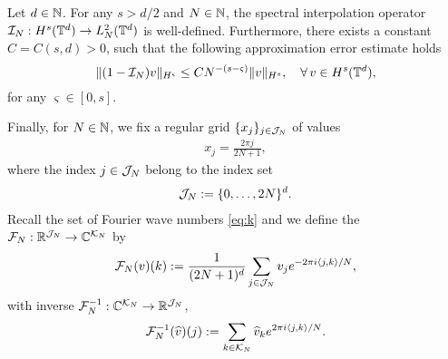 \documentclass[reqno,a4paper]{amsart}
\begin{document}
\begin{theorem}
\label{thm:psest}
Let $d \in \mathbb{N}$. For any $s > d/2$ and $N\in \mathbb{N}$, the spectral interpolation operator $\mathcal{I}_N: H^s(\mathbb{T}^d) \to L^2_N(\mathbb{T}^d)$ is well-defined. Furthermore, there exists a constant $C=C(s,d)>0$, such that the following approximation error estimate holds
\[
\Vert (1-\mathcal{I}_N) v \Vert_{H^\varsigma}
\le 
C N^{-(s-\varsigma)} \Vert v \Vert_{H^s},
\quad
\forall \, v\in H^s(\mathbb{T}^d),
\]
 for any $\varsigma \in [0,s]$.	
\end{theorem}

Finally, for $N\in \mathbb{N}$, we fix a regular grid $\{x_j\}_{j\in \mathcal{J}_N}$ of values
\begin{align} \label{eq:grid}
x_j = \frac{2\pi j}{2N+1}, 
\end{align}
where the index $j\in \mathcal{J}_N$ belong to the index set 
\begin{align} \label{eq:index}
\mathcal{J}_N:=\{0,\dots, 2N\}^d.
\end{align}
Recall the set of Fourier wave numbers \eqref{eq:k} and we define the  $\mathcal{F}_N: \mathbb{R}^{\mathcal{J}_N} \to \mathbb{C}^{\mathcal{K}_N}$ by 
\begin{equation}
    \label{eq:dft}
\mathcal{F}_N(v)(k)
:=
\frac{1}{(2N+1)^d}
\sum_{j\in \mathcal{J}_N}
v_j e^{-2\pi i \langle j, k\rangle/{N}},
\end{equation}
with inverse $\mathcal{F}^{-1}_N: \mathbb{C}^{\mathcal{K}_N} \to \mathbb{R}^{\mathcal{J}_N}$, 
\begin{equation}
    \label{eq:dift}
\mathcal{F}^{-1}_N(\widehat{v})(j)
:=
\sum_{k\in \mathcal{K}_N}
\widehat{v}_k e^{2\pi i \langle j, k \rangle / N}.
\end{equation}
\end{document}
